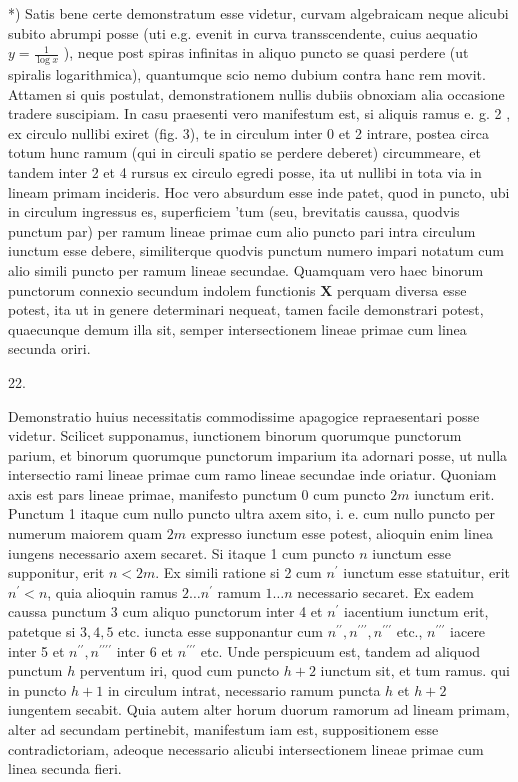 \documentclass[10pt]{article}
\begin{document}
*) Satis bene certe demonstratum esse videtur, curvam algebraicam neque alicubi subito abrumpi posse (uti e.g. evenit in curva transscendente, cuius aequatio \(y=\frac{1}{\log x}\) ), neque post spiras infinitas in aliquo puncto se quasi perdere (ut spiralis logarithmica), quantumque scio nemo dubium contra hanc rem movit. Attamen si quis postulat, demonstrationem nullis dubiis obnoxiam alia occasione tradere suscipiam. In casu praesenti vero manifestum est, si aliquis ramus e. g. 2 , ex circulo nullibi exiret (fig. 3), te in circulum inter 0 et 2 intrare, postea circa totum hunc ramum (qui in circuli spatio se perdere deberet) circummeare, et tandem inter 2 et 4 rursus ex circulo egredi posse, ita ut nullibi in tota via in lineam primam incideris. Hoc vero absurdum esse inde patet, quod in puncto, ubi in circulum ingressus es, superficiem
'tum (seu, brevitatis caussa, quodvis punctum par) per ramum lineae primae cum alio puncto pari intra circulum iunctum esse debere, similiterque quodvis punctum numero impari notatum cum alio simili puncto per ramum lineae secundae. Quamquam vero haec binorum punctorum connexio secundum indolem functionis \(\boldsymbol{X}\) perquam diversa esse potest, ita ut in genere determinari nequeat, tamen facile demonstrari potest, quaecunque demum illa sit, semper intersectionem lineae primae cum linea secunda oriri.

22.

Demonstratio huius necessitatis commodissime apagogice repraesentari posse videtur. Scilicet supponamus, iunctionem binorum quorumque punctorum parium, et binorum quorumque punctorum imparium ita adornari posse, ut nulla intersectio rami lineae primae cum ramo lineae secundae inde oriatur. Quoniam axis est pars lineae primae, manifesto punctum 0 cum puncto \(2 m\) iunctum erit. Punctum 1 itaque cum nullo puncto ultra axem sito, i. e. cum nullo puncto per numerum maiorem quam \(2 m\) expresso iunctum esse potest, alioquin enim linea iungens necessario axem secaret. Si itaque 1 cum puncto \(n\) iunctum esse supponitur, erit \(n<2 m\). Ex simili ratione si 2 cum \(n^{\prime}\) iunctum esse statuitur, erit \(n^{\prime}<n\), quia alioquin ramus \(2 \ldots n^{\prime}\) ramum \(1 \ldots n\) necessario secaret. Ex eadem caussa punctum 3 cum aliquo punctorum inter 4 et \(n^{\prime}\) iacentium iunctum erit, patetque si \(3,4,5\) etc. iuncta esse supponantur cum \(n^{\prime \prime}, n^{\prime \prime \prime}, n^{\prime \prime \prime}\) etc., \(n^{\prime \prime \prime}\) iacere inter 5 et \(n^{\prime \prime}, n^{\prime \prime \prime \prime}\) inter 6 et \(n^{\prime \prime \prime}\) etc. Unde perspicuum est, tandem ad aliquod punctum \(h\) perventum iri, quod cum puncto \(h+2\) iunctum sit, et tum ramus. qui in puncto \(h+1\) in circulum intrat, necessario ramum puncta \(h\) et \(h+2\) iungentem secabit. Quia autem alter horum duorum ramorum ad lineam primam, alter ad secundam pertinebit, manifestum iam est, suppositionem esse contradictoriam, adeoque necessario alicubi intersectionem lineae primae cum linea secunda fieri.
\end{document}
